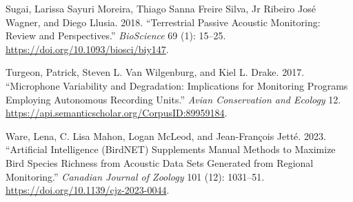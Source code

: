 \documentclass[
  letterpaper,
  DIV=11,
  numbers=noendperiod]{scrartcl}
\newlength{\cslhangindent}
\newenvironment{CSLReferences}[2] %
 {\begin{list}{}{%
  \setlength{\itemindent}{0pt}
  \setlength{\leftmargin}{0pt}
  \setlength{\parsep}{0pt}
  \ifodd #1
   \setlength{\leftmargin}{\cslhangindent}
   \setlength{\itemindent}{-1\cslhangindent}
  \fi
  \setlength{\itemsep}{#2\baselineskip}}}
 {\end{list}}
\begin{document}
\begin{CSLReferences}{1}{0}
Sugai, Larissa Sayuri Moreira, Thiago Sanna Freire Silva, Jr Ribeiro
José Wagner, and Diego Llusia. 2018. {``{Terrestrial Passive Acoustic
Monitoring: Review and Perspectives}.''} \emph{BioScience} 69 (1):
15--25. \url{https://doi.org/10.1093/biosci/biy147}.

Turgeon, Patrick, Steven L. Van Wilgenburg, and Kiel L. Drake. 2017.
{``Microphone Variability and Degradation: Implications for Monitoring
Programs Employing Autonomous Recording Units.''} \emph{Avian
Conservation and Ecology} 12.
\url{https://api.semanticscholar.org/CorpusID:89959184}.

Ware, Lena, C. Lisa Mahon, Logan McLeod, and Jean-François Jetté. 2023.
{``Artificial Intelligence (BirdNET) Supplements Manual Methods to
Maximize Bird Species Richness from Acoustic Data Sets Generated from
Regional Monitoring.''} \emph{Canadian Journal of Zoology} 101 (12):
1031--51. \url{https://doi.org/10.1139/cjz-2023-0044}.

\end{CSLReferences}
\end{document}
